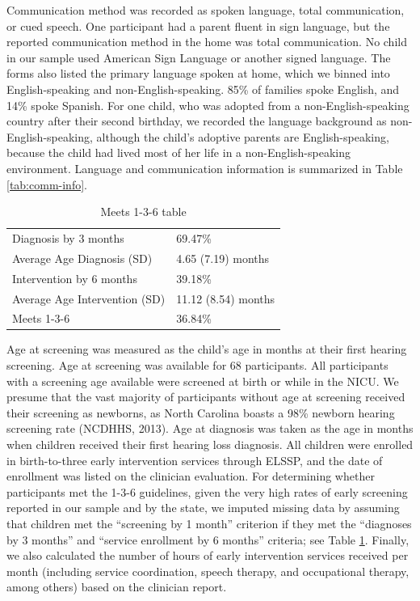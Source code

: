 \documentclass[english,man]{apa6}
\begin{document}
Communication method was recorded as spoken language, total communication, or cued speech. One participant had a parent fluent in sign language, but the reported communication method in the home was total communication. No child in our sample used American Sign Language or another signed language. The forms also listed the primary language spoken at home, which we binned into English-speaking and non-English-speaking. 85\% of families spoke English, and 14\% spoke Spanish. For one child, who was adopted from a non-English-speaking country after their second birthday, we recorded the language background as non-English-speaking, although the child's adoptive parents are English-speaking, because the child had lived most of her life in a non-English-speaking environment. Language and communication information is summarized in Table \ref{tab:comm-info}.

\begin{table}[!h]

\caption{\label{tab:meets136-info}Meets 1-3-6 table}
\centering
\begin{tabular}[t]{l|l}
\hline
 & \\
\hline
Diagnosis by 3 months & 69.47\%\\
\hline
Average Age Diagnosis (SD) & 4.65 (7.19) months\\
\hline
Intervention by 6 months & 39.18\%\\
\hline
Average Age Intervention (SD) & 11.12 (8.54) months\\
\hline
Meets 1-3-6 & 36.84\%\\
\hline
\end{tabular}
\end{table}

Age at screening was measured as the child's age in months at their first hearing screening. Age at screening was available for 68 participants. All participants with a screening age available were screened at birth or while in the NICU. We presume that the vast majority of participants without age at screening received their screening as newborns, as North Carolina boasts a 98\% newborn hearing screening rate (NCDHHS, 2013). Age at diagnosis was taken as the age in months when children received their first hearing loss diagnosis. All children were enrolled in birth-to-three early intervention services through ELSSP, and the date of enrollment was listed on the clinician evaluation. For determining whether participants met the 1-3-6 guidelines, given the very high rates of early screening reported in our sample and by the state, we imputed missing data by assuming that children met the \enquote{screening by 1 month} criterion if they met the \enquote{diagnoses by 3 months} and \enquote{service enrollment by 6 months} criteria; see Table \ref{tab:meets136-info}. Finally, we also calculated the number of hours of early intervention services received per month (including service coordination, speech therapy, and occupational therapy, among others) based on the clinician report.
\end{document}
